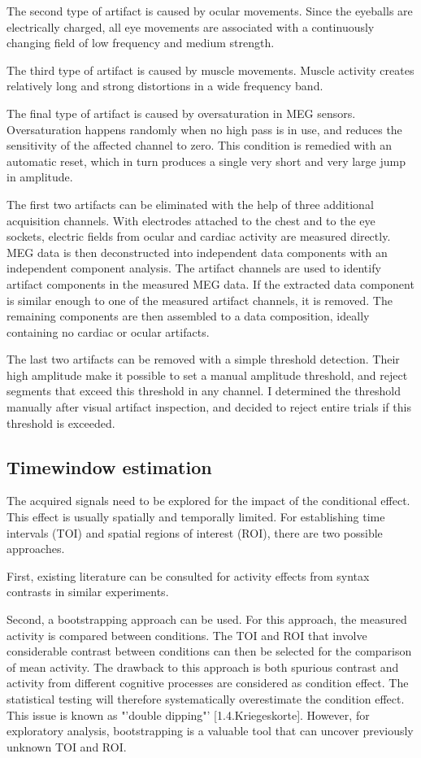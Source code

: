 The second type of artifact is caused by ocular movements.
Since the eyeballs are electrically charged, all eye movements are associated with a continuously changing field of low frequency and medium strength.

The third type of artifact is caused by muscle movements.
Muscle activity creates relatively long and strong distortions in a wide frequency band.

The final type of artifact is caused by oversaturation in MEG sensors.
Oversaturation happens randomly when no high pass is in use, and reduces the sensitivity of the affected channel to zero.
This condition is remedied with an automatic reset, which in turn produces a single very short and very large jump in amplitude.

The first two artifacts can be eliminated with the help of three additional acquisition channels.
With electrodes attached to the chest and to the eye sockets, electric fields from ocular and cardiac activity are measured directly.
MEG data is then deconstructed into independent data components with an independent component analysis.
The artifact channels are used to identify artifact components in the measured MEG data.
If the extracted data component is similar enough to one of the measured artifact channels, it is removed. 
The remaining components are then assembled to a data composition, ideally containing no cardiac or ocular artifacts.

The last two artifacts can be removed with a simple threshold detection.
Their high amplitude make it possible to set a manual amplitude threshold, and reject segments that exceed this threshold in any channel.
I determined the threshold manually after visual artifact inspection, and decided to reject entire trials if this threshold is exceeded.

\subsection{Timewindow estimation}
The acquired signals need to be explored for the impact of the conditional effect.
This effect is usually spatially and temporally limited.
For establishing time intervals (TOI) and spatial regions of interest (ROI), there are two possible approaches.

First, existing literature can be consulted for activity effects from syntax contrasts in similar experiments.

Second, a bootstrapping approach can be used.
For this approach, the measured activity is compared between conditions.
The TOI and ROI that involve considerable contrast between conditions can then be selected for the comparison of mean activity.
The drawback to this approach is both spurious contrast and activity from different cognitive processes are considered as condition effect.
The statistical testing will therefore systematically overestimate the condition effect.
This issue is known as "'double dipping"' [1.4.Kriegeskorte].
However, for exploratory analysis, bootstrapping is a valuable tool that can uncover previously unknown TOI and ROI.

